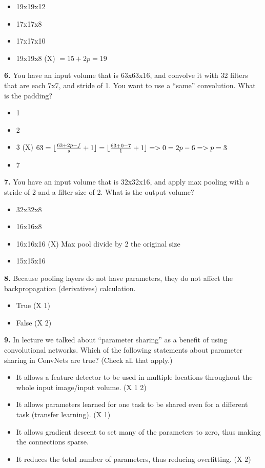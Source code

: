 \begin{itemize}
    \item 19x19x12
    \item 17x17x8
    \item 17x17x10
    \item 19x19x8 (X) $= 15+2p= 19$
\end{itemize}
\textbf{6.} You have an input volume that is 63x63x16, and convolve it with 32 filters that are each 7x7, and stride of 1. You want to use a “same” convolution. What is the padding?
\begin{itemize}
    \item 1
    \item 2
    \item 3 (X) $63=\lfloor\frac{63+2p-f}{s}+1\rfloor=\lfloor\frac{63+0-7}{1}+1\rfloor=> 0=2p-6 => p = 3$
    \item 7
\end{itemize}
\textbf{7.} You have an input volume that is 32x32x16, and apply max pooling with a stride of 2 and a filter size of 2. What is the output volume?
\begin{itemize}
    \item 32x32x8
    \item 16x16x8
    \item 16x16x16 (X) Max pool divide by 2 the original size
    \item 15x15x16
\end{itemize}
\textbf{8.} Because pooling layers do not have parameters, they do not affect the backpropagation (derivatives) calculation.
\begin{itemize}
    \item True (X 1)
    \item False (X 2)
\end{itemize}
\textbf{9.} In lecture we talked about “parameter sharing” as a benefit of using convolutional networks. Which of the following statements about parameter sharing in ConvNets are true? (Check all that apply.)
\begin{itemize}
    \item It allows a feature detector to be used in multiple locations throughout the whole input image/input volume. (X 1 2)
    \item It allows parameters learned for one task to be shared even for a different task (transfer learning). (X 1)
    \item It allows gradient descent to set many of the parameters to zero, thus making the connections sparse.
    \item It reduces the total number of parameters, thus reducing overfitting. (X 2)
\end{itemize}
